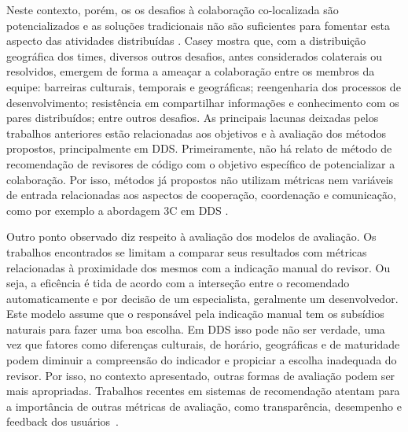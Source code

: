 \documentclass[sigconf]{acmart}
\begin{document}
Neste contexto, porém, os os desafios à colaboração co-localizada são potencializados e as soluções tradicionais não são suficientes para fomentar esta aspecto das atividades distribuídas \cite{nicolaci2011}. Casey \cite{casey2010} mostra que, com a distribuição geográfica dos times, diversos outros desafios, antes considerados colaterais ou resolvidos, emergem de forma a ameaçar a colaboração entre os membros da equipe: barreiras culturais, temporais e geográficas; reengenharia dos processos de desenvolvimento; resistência em compartilhar informações e conhecimento com os pares distribuídos; entre outros desafios.
As principais lacunas deixadas pelos trabalhos anteriores estão relacionadas aos objetivos e à avaliação dos métodos propostos, principalmente em DDS. Primeiramente, não há relato de método de recomendação de revisores de código com o objetivo específico de potencializar a colaboração. Por isso, métodos já propostos não utilizam métricas nem variáveis de entrada relacionadas aos aspectos de cooperação, coordenação e comunicação, como por exemplo a abordagem 3C em DDS \cite{fuks2003}.

Outro ponto observado diz respeito à avaliação dos modelos de avaliação. Os trabalhos encontrados se limitam a comparar seus resultados com métricas relacionadas à proximidade dos mesmos com a indicação manual do revisor. Ou seja, a eficência é tida de acordo com a interseção entre o recomendado automaticamente e por decisão de um especialista, geralmente um desenvolvedor. Este modelo assume que o responsável pela indicação manual tem os subsídios naturais para fazer uma boa escolha. Em DDS isso pode não ser verdade, uma vez que fatores como diferenças culturais, de horário, geográficas e de maturidade podem diminuir a compreensão do indicador e propiciar a escolha inadequada do revisor. Por isso, no contexto apresentado, outras formas de avaliação podem ser mais apropriadas. Trabalhos recentes em sistemas de recomendação atentam para a importância de outras métricas de avaliação, como transparência, desempenho e feedback dos usuários~\cite{he2016}.
\end{document}
